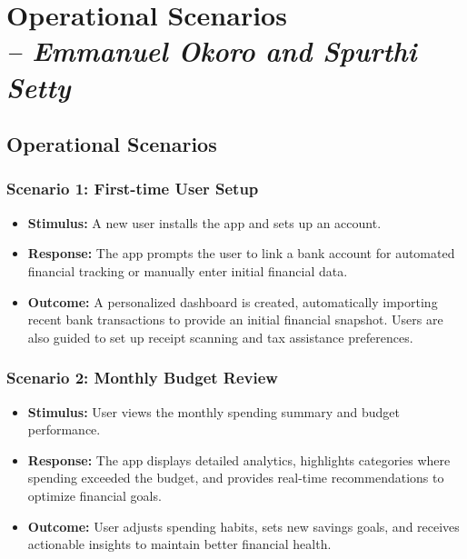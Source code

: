\chapter{Operational Scenarios \\
\small{\textit{-- Emmanuel Okoro and Spurthi Setty }}
\label{Chapter::Operational Scenarios}}

\section{Operational Scenarios}

\subsection*{Scenario 1: First-time User Setup}
\begin{itemize}
    \item \textbf{Stimulus:} A new user installs the app and sets up an account.
    \item \textbf{Response:} The app prompts the user to link a bank account for automated financial tracking or manually enter initial financial data. 
    \item \textbf{Outcome:} A personalized dashboard is created, automatically importing recent bank transactions to provide an initial financial snapshot. Users are also guided to set up receipt scanning and tax assistance preferences.
\end{itemize}

\subsection*{Scenario 2: Monthly Budget Review}
\begin{itemize}
    \item \textbf{Stimulus:} User views the monthly spending summary and budget performance.
    \item \textbf{Response:} The app displays detailed analytics, highlights categories where spending exceeded the budget, and provides real-time recommendations to optimize financial goals.
    \item \textbf{Outcome:} User adjusts spending habits, sets new savings goals, and receives actionable insights to maintain better financial health.
\end{itemize}

